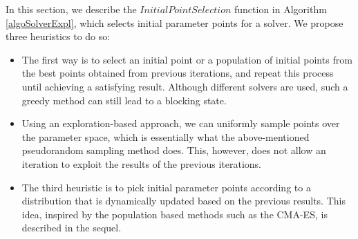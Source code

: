 In this section, we describe the $InitialPointSelection$ function in Algorithm \ref{algoSolverExpl}, which selects initial parameter points for a solver. We propose three heuristics to do so:
\begin{itemize}
\item The first way is to select an initial point or a population of initial points from the best points obtained from previous iterations, and repeat this process until achieving a satisfying result. Although different solvers are used, such a greedy method can still lead to a blocking state. 
\item Using an exploration-based approach, we can uniformly sample points over the parameter space, which is essentially what the above-mentioned pseudorandom sampling method does. This, however, does not allow an iteration to exploit the results of the previous iterations. 
\item The third heuristic is to pick initial parameter points according to a distribution that is dynamically updated based on the previous results. This idea, inspired by the population based methods such as the CMA-ES, is described in the sequel. 
\end{itemize}
